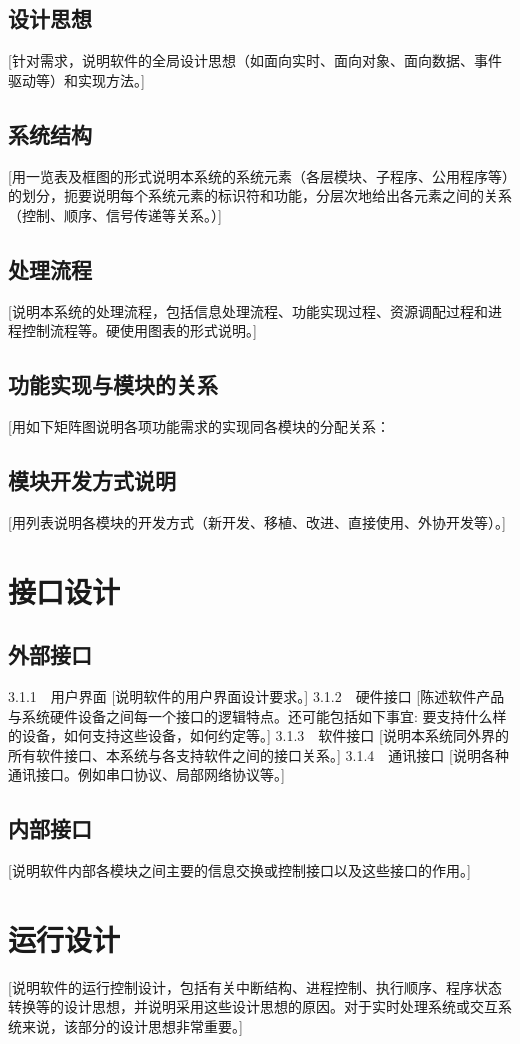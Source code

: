 \documentclass[UTF8]{ctexart}
\begin{document}
	\subsection{设计思想}
		[针对需求，说明软件的全局设计思想（如面向实时、面向对象、面向数据、事件驱动等）和实现方法。]
	\subsection{系统结构}
		[用一览表及框图的形式说明本系统的系统元素（各层模块、子程序、公用程序等）的划分，扼要说明每个系统元素的标识符和功能，分层次地给出各元素之间的关系（控制、顺序、信号传递等关系。）]
	\subsection{处理流程}
		[说明本系统的处理流程，包括信息处理流程、功能实现过程、资源调配过程和进程控制流程等。硬使用图表的形式说明。]
	\subsection{功能实现与模块的关系}
		[用如下矩阵图说明各项功能需求的实现同各模块的分配关系：

	\subsection{模块开发方式说明}
		[用列表说明各模块的开发方式（新开发、移植、改进、直接使用、外协开发等）。]
\section{接口设计}
	\subsection{外部接口}
		3.1.1　用户界面
[说明软件的用户界面设计要求。]
3.1.2　硬件接口
[陈述软件产品与系统硬件设备之间每一个接口的逻辑特点。还可能包括如下事宜: 要支持什么样的设备，如何支持这些设备，如何约定等。]
3.1.3　软件接口
[说明本系统同外界的所有软件接口、本系统与各支持软件之间的接口关系。]
3.1.4　通讯接口
[说明各种通讯接口。例如串口协议、局部网络协议等。]
	\subsection{内部接口}
		[说明软件内部各模块之间主要的信息交换或控制接口以及这些接口的作用。]
\section{运行设计}
		[说明软件的运行控制设计，包括有关中断结构、进程控制、执行顺序、程序状态转换等的设计思想，并说明采用这些设计思想的原因。对于实时处理系统或交互系统来说，该部分的设计思想非常重要。]
\end{document}
